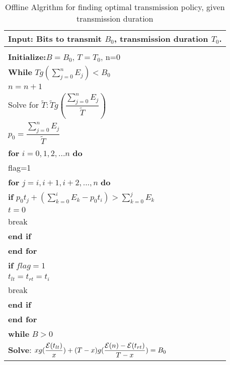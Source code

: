 \begin{table}
\begin{minipage}[b]{8cm}
\caption{Offline Algrithm for finding optimal transmission policy, given transmission duration}
\begin{tabular}{p{7cm}}
\hline \textbf{Input}: Bits to transmit $B_0$, transmission duration $T_0$.\\
\hline
\\
\textbf{Initialize:}$B = B_0$, $T = T_0$, n=0
\\
\textbf{While} $Tg(\sum_{j=0}^n E_j) < B_0$
\\
\hspace{4mm} $n = n+1$
\\
Solve for $\tilde{T}: \tilde{T}g(\dfrac{\sum_{j=0}^n E_j}{\tilde{T}})$
\\
$p_0=\dfrac{\sum_{j=0}^n E_j}{\tilde{T}}$
\\
\textbf{for} $i=0,1,2,...n$ \textbf{do}
\\
\hspace{4mm}flag=1
\\
\hspace{4mm}\textbf{for} $j=i,i+1,i+2,...,n$ \textbf{do}
\\
\hspace{7mm}\textbf{if} $p_0t_j + (\sum_{k=0}^i E_k - p_0t_i) > \sum_{k=0}^j E_k$
\\
\hspace{10mm}$t=0$
\\
\hspace{10mm}break
\\
\hspace{7mm}\textbf{end if}
\\
\hspace{4mm}\textbf{end for}
\\
\hspace{4mm}\textbf{if} $flag=1$
\\
\hspace{7mm}$t_{lt} = t_{rt} = t_i$
\\
\hspace{7mm}break
\\
\hspace{4mm}\textbf{end if}
\\
\textbf{end for}
\\
\textbf{while} $B>0$
\\
\hspace{4mm}\textbf{Solve}: $xg(\dfrac{\mathcal{E}(t_{lt})}{x})+(T-x)g(\dfrac{\mathcal{E}(n)-\mathcal{E}(t_{rt})}{T-x}) = B_0$
\\

\end{tabular}
\end{minipage}
\end{table}
